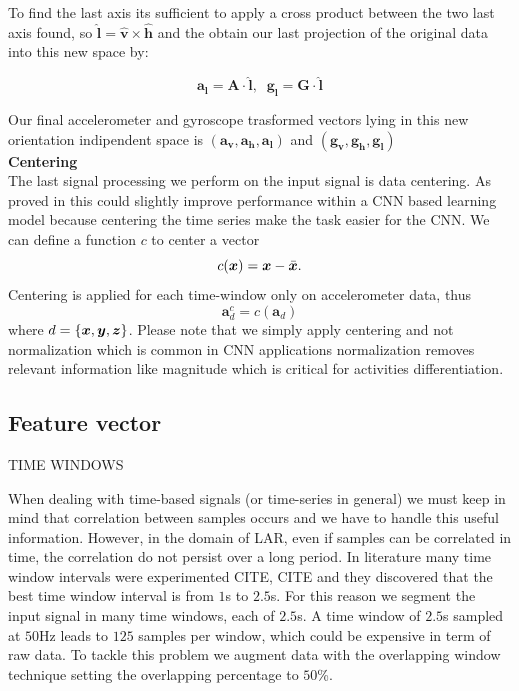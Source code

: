To find the last axis its sufficient to apply a cross product between the two last axis found, so $ \boldsymbol{\hat{l}} = \boldsymbol{\hat{v}} \times \boldsymbol{\hat{h}} $ and the obtain our last projection of the original data into this new space by:

$$ \boldsymbol{a_{l}} = \boldsymbol{A} \cdot \boldsymbol{\hat{l}} , \;\; \boldsymbol{g_{l}} = \boldsymbol{G} \cdot \boldsymbol{\hat{l}} $$

Our final accelerometer and gyroscope trasformed vectors lying in this new orientation indipendent space is $(\boldsymbol{a_{v}}, \boldsymbol{a_{h}}, \boldsymbol{a_{l}}) $ and $ (\boldsymbol{g_{v}}, \boldsymbol{g_{h}}, \boldsymbol{g_{l}}) $ \\

\textbf{Centering}\\

The last signal processing we perform on the input signal is data
centering. As proved in \cite{ignatov2018real} this could slightly
improve performance within a CNN based learning model because
centering the time series make the task easier for the CNN. We can
define a function $c$ to center a vector
\begin{equation}
  \label{eq:centering-func}
  c(\x) = \x - \xm.
\end{equation}
Centering is applied for each time-window only on accelerometer data, thus
\begin{equation}
  \label{eq:centering-accelerometer-data}
  \boldsymbol{a}_{d}^{c} = c(\boldsymbol{a}_{d})
\end{equation}
where $d = \{ \boldsymbol{x}, \boldsymbol{y}, \boldsymbol{z} \}$. Please note that we simply apply
centering and not normalization which is common in CNN applications
normalization removes relevant information like magnitude which is
critical for activities differentiation.

\subsection{Feature vector}
\label{subsec:feature-vector}

TIME WINDOWS

When dealing with time-based signals (or time-series in general) we
must keep in mind that correlation between samples occurs and we have
to handle this useful information. However, in the domain of LAR, even
if samples can be correlated in time, the correlation do not persist
over a long period. In literature many time window intervals were
experimented CITE, CITE and they discovered that the best time window
interval is from $1$s to $2.5$s. For this reason we segment the input
signal in many time windows, each of $2.5$s. A time window of $2.5$s
sampled at $50$Hz leads to $125$ samples per window, which could be
expensive in term of raw data. To tackle this problem we augment
data with the overlapping window technique setting the overlapping
percentage to $50$\%.

